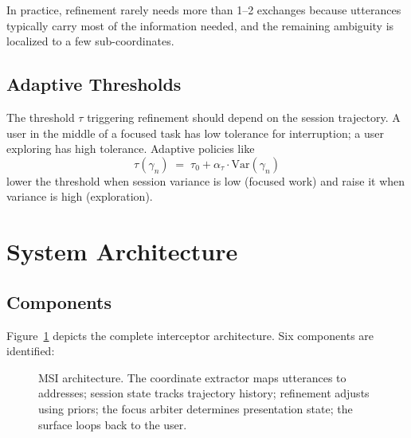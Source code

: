 \documentclass[11pt,twocolumn,a4paper]{article}
\theoremstyle{definition}
\theoremstyle{remark}
\begin{document}
In practice, refinement rarely needs more than 1--2 exchanges because utterances typically carry most of the information needed, and the remaining ambiguity is localized to a few sub-coordinates.

\subsection{Adaptive Thresholds}

The threshold $\tau$ triggering refinement should depend on the session trajectory. A user in the middle of a focused task has low tolerance for interruption; a user exploring has high tolerance. Adaptive policies like
\[
\tau(\gamma_n) \;=\; \tau_0 + \alpha_{\tau} \cdot \mathrm{Var}(\gamma_n)
\]
lower the threshold when session variance is low (focused work) and raise it when variance is high (exploration).

\section{System Architecture}
\label{sec:arch}

\subsection{Components}

Figure~\ref{fig:arch} depicts the complete interceptor architecture. Six components are identified:

\begin{figure}[t]
\centering
{}
\caption{MSI architecture. The coordinate extractor maps utterances to addresses; session state tracks trajectory history; refinement adjusts using priors; the focus arbiter determines presentation state; the surface loops back to the user.}
\label{fig:arch}
\end{figure}
\end{document}
